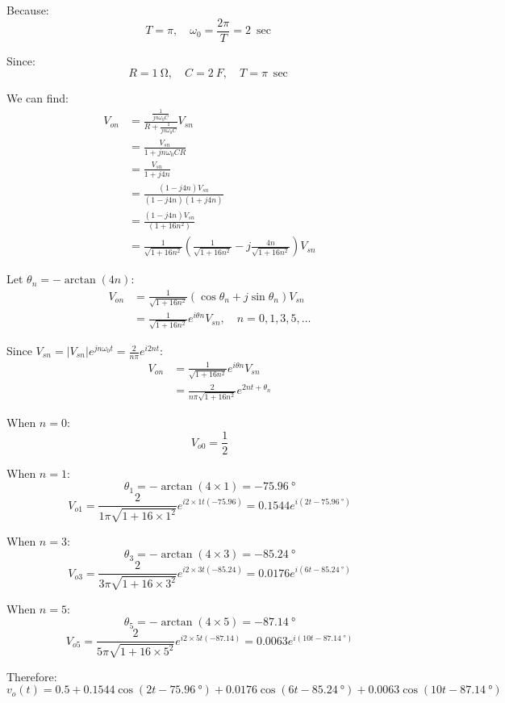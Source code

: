 \documentclass[11pt]{article}
\begin{document}
Because:
\[T = \pi, \quad \omega_0 = \frac{2 \pi}{T} = \qty{2}{\sec}\]

Since:
\[R = \qty{1}{\ohm}, \quad C = \qty{2}{F}, \quad T = \pi \ \unit{\sec}\]

We can find:
\begin{align*}
V_{on} &= \frac{\frac{1}{jn \omega_0 C}}{R + \frac{1}{jn \omega_0 C}} V_{sn} \\
&= \frac{V_{sn}}{1 + jn \omega_0 CR} \\
&= \frac{V_{sn}}{1 + j4n} \\
&= \frac{(1 - j4n) V_{sn}}{(1 - j4n)(1 + j4n)} \\
&= \frac{(1 - j4n) V_{sn}}{(1 + 16n^2)} \\
&= \frac{1}{\sqrt{1 + 16n^2}} \left(\frac{1}{\sqrt{1 + 16n^2}} - j \frac{4n}{\sqrt{1 + 16n^2}} \right) V_{sn}
\end{align*}

Let \(\theta_n = - \arctan (4n)\):
\begin{align*}
V_{on} &= \frac{1}{\sqrt{1 + 16n^2}} (\cos \theta_n + j \sin \theta_n) V_{sn} \\
&= \frac{1}{\sqrt{1 + 16n^2}} e^{i \theta n} V_{sn}, \quad n = 0, 1, 3, 5, \ldots
\end{align*}

Since \(V_{sn} = |V_{sn}| e^{jn \omega_0 t} = \frac{2}{n \pi} e^{i2nt}\):
\begin{align*}
V_{on} &= \frac{1}{\sqrt{1 + 16n^2}} e^{i \theta n} V_{sn} \\
&= \frac{2}{n \pi \sqrt{1 + 16n^2}} e^{2nt + \theta_n}
\end{align*}

When \(n = 0\):
\[V_{o0} = \frac{1}{2}\]

When \(n = 1\):
\[\theta_1 = - \arctan (4 \times 1) = \qty{-75.96}{\degree}\]
\[V_{o1} = \frac{2}{1 \pi \sqrt{1 + 16 \times 1^2}} e^{i 2 \times 1t (-75.96)} = 0.1544e^{i(2t - \qty{75.96}{\degree})}\]

When \(n = 3\):
\[\theta_3 = - \arctan (4 \times 3) = \qty{-85.24}{\degree}\]
\[V_{o3} = \frac{2}{3 \pi \sqrt{1 + 16 \times 3^2}} e^{i 2 \times 3t (-85.24)} = 0.0176e^{i(6t - \qty{85.24}{\degree})}\]

When \(n = 5\):
\[\theta_5 = - \arctan (4 \times 5) = \qty{-87.14}{\degree}\]
\[V_{o5} = \frac{2}{5 \pi \sqrt{1 + 16 \times 5^2}} e^{i 2 \times 5t (-87.14)} = 0.0063e^{i(10t - \qty{87.14}{\degree})}\]

Therefore:
\[v_o (t) = 0.5 + 0.1544 \cos (2t - \qty{75.96}{\degree}) + 0.0176 \cos (6t - \qty{85.24}{\degree}) + 0.0063 \cos (10t - \qty{87.14}{\degree})\]
\end{document}
